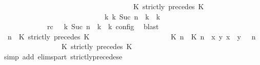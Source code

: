 \begin{isabellebody}
\ \ \ \ \ \ \ \ \ \ \ \ \ \ \ \ \ \ \ \ \ \ \ \ \ \ \ \ \ \ \ \ \ \ {\isasymturnstile}\ {\isasymPsi}\ {\isasymtriangleright}\ {\isacharparenleft}{\isacharparenleft}K\ strictly\ precedes\ K\ {\isacharhash}\ {\isasymPhi}{\isacharparenright}{\isacharparenright}\isanewline
\ \ \ \ \ \ \ \ \ \ \ \ \ \ \ \ \ \ \ \ \ \ \ \ \ \ \ \ \ {\isasymhookrightarrow}\isactrlbsup k\isactrlesup \ {\isacharparenleft}{\isasymGamma}\isactrlsub k{\isacharcomma}\ Suc\ n\ {\isasymturnstile}\ {\isasymPsi}\isactrlsub k\ {\isasymtriangleright}\ {\isasymPhi}\isactrlsub k{\isacharparenright}{\isacartoucheclose}\isanewline
\ \ \ \ \ \ \ \ \ \ \ \ \ rc{\isacharcolon}{\isacartoucheopen}{\isasymrho}\ {\isasymin}\ {\isasymlbrakk}\ {\isasymGamma}\isactrlsub k{\isacharcomma}\ Suc\ n\ {\isasymturnstile}\ {\isasymPsi}\isactrlsub k\ {\isasymtriangleright}\ {\isasymPhi}\isactrlsub k\ {\isasymrbrakk}\isactrlsub c\isactrlsub o\isactrlsub n\isactrlsub f\isactrlsub i\isactrlsub g{\isacartoucheclose}\ \isamarkupfalse%
\ blast\isanewline
\ \ \ \ \ \ \ \ \isamarkupfalse%
\ {\isacartoucheopen}{\isacharparenleft}{\isasymGamma}{\isacharcomma}\ n\ {\isasymturnstile}\ {\isacharparenleft}{\isacharparenleft}K\ strictly\ precedes\ K\ {\isacharhash}\ {\isasymPsi}{\isacharparenright}\ {\isasymtriangleright}\ {\isasymPhi}{\isacharparenright}\isanewline
\ \ \ \ \ \ \ \ \ \ \ \ \ \ \ \ {\isasymhookrightarrow}\ {\isacharparenleft}{\isacharparenleft}{\isacharparenleft}{\isasymlceil}{\isacharhash}\isactrlsup {\isasymle}\ K\ n{\isacharcomma}\ {\isacharhash}\isactrlsup {\isacharless}\ K\ n{\isasymrceil}\ {\isasymin}\ {\isacharparenleft}{\isasymlambda}{\isacharparenleft}x{\isacharcomma}\ y{\isacharparenright}{\isachardot}\ x\ {\isasymle}\ y{\isacharparenright}{\isacharparenright}\ {\isacharhash}\ {\isasymGamma}{\isacharparenright}{\isacharcomma}\ n\isanewline
\ \ \ \ \ \ \ \ \ \ \ \ \ \ {\isasymturnstile}\ {\isasymPsi}\ {\isasymtriangleright}\ {\isacharparenleft}{\isacharparenleft}K\ strictly\ precedes\ K\ {\isacharhash}\ {\isasymPhi}{\isacharparenright}{\isacharparenright}{\isacartoucheclose}\isanewline
\ \ \ \ \ \ \ \ \ \ \isamarkupfalse%
\ {\isacharparenleft}simp\ add{\isacharcolon}\ elims{\isacharunderscore}part\ strictly{\isacharunderscore}precedes{\isacharunderscore}e{\isacharparenright}\isanewline

\end{isabellebody}
